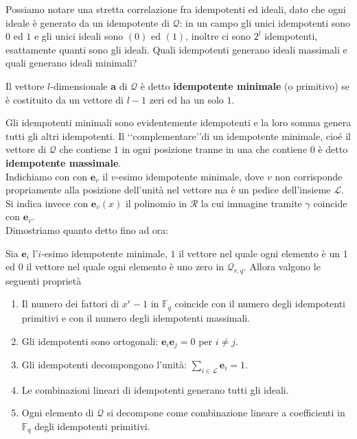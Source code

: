 Possiamo notare una stretta correlazione fra idempotenti ed ideali, dato che ogni ideale è generato da un idempotente di $\mathcal{Q}$: in un campo gli unici idempotenti sono $0$ ed $1$ e gli unici ideali sono $(0)$ ed $(1)$, inoltre ci sono $2^{l}$ idempotenti, esattamente quanti sono gli ideali. Quali idempotenti generano ideali massimali e quali generano ideali minimali?
\begin{definizione}
   Il vettore $l$-dimensionale {\bf a} di $\mathcal{Q}$ è detto {\bf idempotente minimale} (o primitivo) se è costituito da un vettore di $l-1$ zeri ed ha un solo $1$.
\end{definizione}
\noindent
Gli idempotenti minimali sono evidentemente idempotenti e la loro somma genera tutti gli altri idempotenti. Il \lq\lq complementare\rq\rq di un idempotente minimale, cioé il vettore di $\mathcal{Q}$ che contiene $1$ in ogni posizione tranne in una che contiene $0$ è detto {\bf idempotente massimale}.\\
Indichiamo con con $\mathbf{e}_{v}$ il $v$-esimo idempotente minimale, dove $v$ non corrisponde propriamente alla posizione dell'unità nel vettore ma è un pedice dell'insieme $\mathscr{L}$. Si indica invece con $\mathbf{e}_{v}(x)$ il polinomio in $\mathcal{R}$ la cui immagine tramite $\gamma$ coincide con $\mathbf{e}_{v}$. \\
Dimostriamo quanto detto fino ad ora:
\begin{teorema}
   Sia $\mathbf{e}_{i}$ l'$i$-esimo idempotente minimale, $\mathfrak{1}$ il vettore nel quale ogni elemento è un $1$ ed $\mathfrak{0}$ il vettore nel quale ogni elemento è uno zero in $\mathcal{Q}_{r,q}$. Allora valgono le seguenti proprietà
   \begin{enumerate}
      \item Il numero dei fattori di $x^r-1$ in $\mathbb{F}_{q}$ coincide con il numero degli idempotenti primitivi e con il numero degli idempotenti massimali.
      \item Gli idempotenti sono ortogonali: $\mathbf{e}_{i}\mathbf{e}_{j}  = \mathfrak{0}$ per $i \neq j$.
      \item Gli idempotenti decompongono l'unità: $\sum_{i \in \mathscr{L}}\mathbf{e}_{i}  = \mathfrak{1}$.
      \item Le combinazioni lineari di idempotenti generano tutti gli ideali.
      \item Ogni elemento di $\mathcal{Q}$ si decompone come combinazione lineare a coefficienti in $\mathbb{F}_{q}$ degli idempotenti primitivi.
   \end{enumerate}
\end{teorema}
